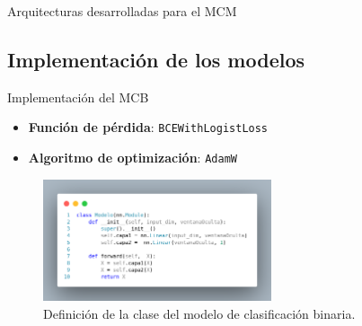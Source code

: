 \begin{frame}{Arquitecturas desarrolladas para el MCM}
\end{frame}

\subsection{Implementación de los modelos}
\begin{frame}{Implementación del MCB}
	\begin{itemize}
		\item \textbf{Función de pérdida}: \texttt{BCEWithLogistLoss}
		\item \textbf{Algoritmo de optimización}: \texttt{AdamW}
	\end{itemize}
	
	\begin{figure}[H]
	    \centering
	    \includegraphics[width=0.6\textwidth]{../Memoria/img/modelo/codigo/modeloBIN.png}
	    	\caption{Definición de la clase del modelo de clasificación binaria.}
    		\label{fig:modBIN}
	\end{figure}
	
	\begin{table}[H]
		\centering 
		\caption{Valores de los hiperparámetros utilizados en los experimentos del modelo de clasificación binaria.}
		\label{tab:hiperBIN}
	\end{table}
\end{frame}

